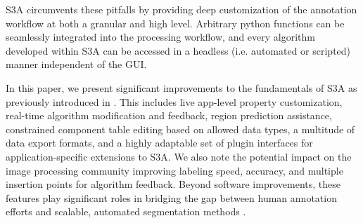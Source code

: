 \makeSampleSegFig
\makeBeesFig


S3A circumvents these pitfalls by providing deep customization of the annotation workflow at both a granular and high level.
Arbitrary python functions can be seamlessly integrated into the processing workflow, and every algorithm developed within S3A can be accessed in a headless (i.e. automated or scripted) manner independent of the GUI.

In this paper, we present significant improvements to the fundamentals of S3A as previously introduced in \cite{jessurunComponentDetectionEvaluation2020}.
This includes live app-level property customization, real-time algorithm modification and feedback, region prediction assistance, constrained component table editing based on allowed data types, a multitude of data export formats, and a highly adaptable set of plugin interfaces for application-specific extensions to S3A.
We also note the potential impact on the image processing community improving labeling speed, accuracy, and multiple insertion points for algorithm feedback.
Beyond software improvements, these features play significant roles in bridging the gap between human annotation efforts and scalable, automated segmentation methods \cite{Branson_humansInLoop}.